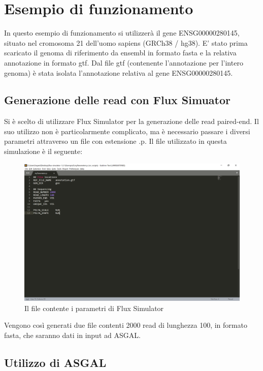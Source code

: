 \section{Esempio di funzionamento}

In questo esempio di funzionamento si utilizzerà il gene ENSG00000280145, situato nel cromosoma 21 dell'uomo sapiens (GRCh38 / hg38). E' stato prima scaricato il   genoma di riferimento da ensembl in formato fasta e la relativa annotazione in formato gtf. Dal file gtf (contenente l'annotazione per l'intero genoma) è stata isolata l'annotazione relativa al gene ENSG00000280145.

\subsection{Generazione delle read con Flux Simuator}

Si è scelto di utilizzare Flux Simulator per la generazione delle read paired-end. Il suo utilizzo non è particolarmente complicato, ma è necessario passare i diversi parametri attraverso un file con estensione .p. Il file utilizzato in questa simulazione è il seguente:

\begin{figure}[h]
	\centering
	\includegraphics[width=\linewidth]{images/parameters.png}
  \caption{Il file contente i parametri di Flux Simulator}
  \label{fig:Parameters}
\end{figure}

Vengono così generati due file contenti 2000 read di lunghezza 100, in formato fasta, che saranno dati in input ad ASGAL.

\newpage

\subsection{Utilizzo di ASGAL}

